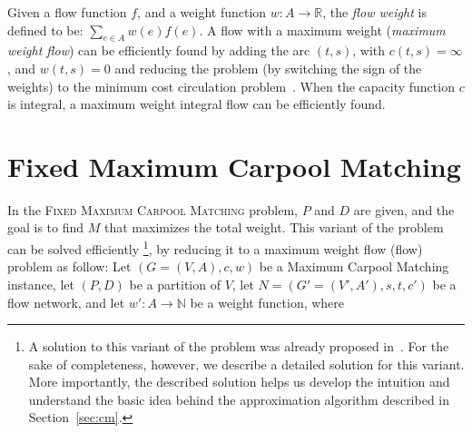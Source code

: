 \documentclass[draft]{article}
\def\R{\mathbb{R}}
\def\N{\mathbb{N}}
\def\CARPOOL{Maximum Carpool Ma\-tching}
\def\FIXEDCARPOOL{Fixed Maximum Carpool Matching}
\begin{document}
Given a flow function $f$, 
and a weight function $w: A \rightarrow \R$, 
the \emph{flow weight} is defined to be:
$\sum_{e \in A}{w(e)f(e)}$.
A flow with a maximum weight (\emph{maximum weight flow}) can be efficiently found by adding 
the arc $(t, s)$, with $c(t,s) = \infty$, and $w(t,s) = 0$ and reducing the problem
(by switching the sign of the weights) 
to the minimum cost circulation problem~\cite{tardos1985strongly}.
When the capacity function $c$ is integral, 
a maximum weight integral flow can be efficiently found.  


\section{\FIXEDCARPOOL{}}
\label{sec:fixed}
In the \textsc{\FIXEDCARPOOL{}} problem, $P$ and $D$ are given, 
and the goal is to find $M$ that maximizes the total weight. 
This variant of the problem can be solved efficiently
\footnote{A solution to this variant of the problem was already proposed in~\cite{hartman2014theory}.
For the sake of completeness, however, we describe a detailed solution for this variant. 
More importantly, 
the described solution helps us develop the intuition and understand the basic idea behind the
approximation algorithm described in Section~\ref{sec:cm}.   
},
by reducing it to a maximum weight flow (flow) problem as
follow:
Let $(G = (V, A), c, w)$ be a \CARPOOL{} instance,
let $(P, D)$ be a partition of $V$,
let  $N = (G' = (V', A'), s, t, c')$ be a flow network, 
and let $w' : A \rightarrow \N$ be a weight function, where 
\end{document}
